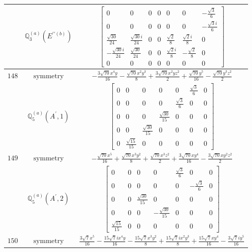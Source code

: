 \documentclass[fleqn,8pt,landscape]{jsarticle}
\begin{document}
\begin{longtable}{ccc}
$  $ & $ \mathbb{Q}_{3}^{(a)}(E^{\prime\prime(b)}) $ & $ \begin{bmatrix} 0 & 0 & 0 & 0 & 0 & 0 & - \frac{\sqrt{3}}{6} \\ 0 & 0 & 0 & 0 & 0 & 0 & - \frac{\sqrt{3} i}{6} \\ \frac{\sqrt{30}}{24} & \frac{\sqrt{30} i}{24} & 0 & 0 & \frac{\sqrt{2}}{8} & \frac{\sqrt{2} i}{8} & 0 \\ - \frac{\sqrt{30} i}{24} & \frac{\sqrt{30}}{24} & 0 & 0 & \frac{\sqrt{2} i}{8} & - \frac{\sqrt{2}}{8} & 0 \\ 0 & 0 & 0 & 0 & 0 & 0 & 0 \end{bmatrix} $ \\ \hline
$ 148 $ & $ \text{symmetry} $ & $ - \frac{3 \sqrt{70} x^{4} y}{16} - \frac{\sqrt{70} x^{2} y^{3}}{8} + \frac{3 \sqrt{70} x^{2} y z^{2}}{2} + \frac{\sqrt{70} y^{5}}{16} - \frac{\sqrt{70} y^{3} z^{2}}{2} $ \\
$  $ & $ \mathbb{Q}_{5}^{(a)}(A^{\prime},1) $ & $ \begin{bmatrix} 0 & 0 & 0 & 0 & 0 & \frac{\sqrt{3}}{6} & 0 \\ 0 & 0 & 0 & 0 & \frac{\sqrt{3}}{6} & 0 & 0 \\ 0 & 0 & 0 & \frac{\sqrt{30}}{15} & 0 & 0 & 0 \\ 0 & 0 & \frac{\sqrt{30}}{15} & 0 & 0 & 0 & 0 \\ 0 & \frac{\sqrt{15}}{15} & 0 & 0 & 0 & 0 & 0 \end{bmatrix} $ \\ \hline
$ 149 $ & $ \text{symmetry} $ & $ - \frac{\sqrt{70} x^{5}}{16} + \frac{\sqrt{70} x^{3} y^{2}}{8} + \frac{\sqrt{70} x^{3} z^{2}}{2} + \frac{3 \sqrt{70} x y^{4}}{16} - \frac{3 \sqrt{70} x y^{2} z^{2}}{2} $ \\
$  $ & $ \mathbb{Q}_{5}^{(a)}(A^{\prime},2) $ & $ \begin{bmatrix} 0 & 0 & 0 & 0 & \frac{\sqrt{3}}{6} & 0 & 0 \\ 0 & 0 & 0 & 0 & 0 & - \frac{\sqrt{3}}{6} & 0 \\ 0 & 0 & \frac{\sqrt{30}}{15} & 0 & 0 & 0 & 0 \\ 0 & 0 & 0 & - \frac{\sqrt{30}}{15} & 0 & 0 & 0 \\ \frac{\sqrt{15}}{15} & 0 & 0 & 0 & 0 & 0 & 0 \end{bmatrix} $ \\ \hline
$ 150 $ & $ \text{symmetry} $ & $ \frac{3 \sqrt{7} x^{5}}{16} - \frac{15 \sqrt{7} i x^{4} y}{16} - \frac{15 \sqrt{7} x^{3} y^{2}}{8} + \frac{15 \sqrt{7} i x^{2} y^{3}}{8} + \frac{15 \sqrt{7} x y^{4}}{16} - \frac{3 \sqrt{7} i y^{5}}{16} $ \\

\end{longtable}
\end{document}

